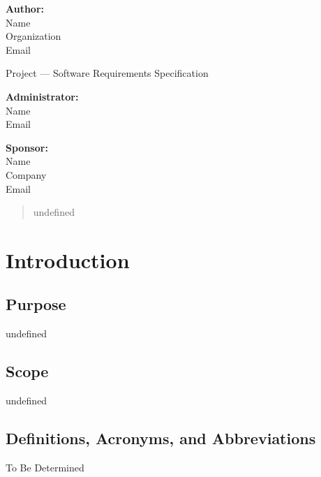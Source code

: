 \documentclass[letterpaper,10pt,compsoc,draftclsnofoot,onecolumn]{IEEEtran}
\begin{document}
\begin{titlepage}
\begin{minipage}{1.0\textwidth}
\centering
\textbf{Author:}\\
Name \\
Organization \\
Email
\end{minipage}
\vfill
\begin{minipage}{1.0\textwidth}
\centering
{}\fontsize{36pt}{36pt}\selectfont 
Project --- Software Requirements Specification
\end{minipage}
\vfill
\begin{minipage}{0.5\textwidth}
\flushleft
\textbf{Administrator:}\\
Name \\
Email
\end{minipage}
%
\begin{minipage}{0.5\textwidth}
\flushright
\textbf{Sponsor:}\\
Name \\
Company \\
Email
\end{minipage}
\vfill
\begin{abstract}
undefined
\end{abstract}
\end{titlepage}

\tableofcontents
\listoffigures
\listoftables
\clearpage
{}

\section{Introduction}
\subsection{Purpose}
undefined

\subsection{Scope}
undefined

\subsection{Definitions, Acronyms, and Abbreviations}
\begin{description}
\item[TBD] To Be Determined
\end{description}
\end{document}
